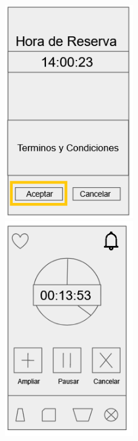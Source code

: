 \documentclass[12pt]{article}
\begin{document}
\begin{figure}[!h]
\centering
{}
	\includegraphics[width=0.5\textwidth]{reservaSitio3.png} 
\endminipage
{}
	\includegraphics[width=0.5\textwidth]{reservaSitio4.png} 
\endminipage
\end{figure}

\newpage
\end{document}
